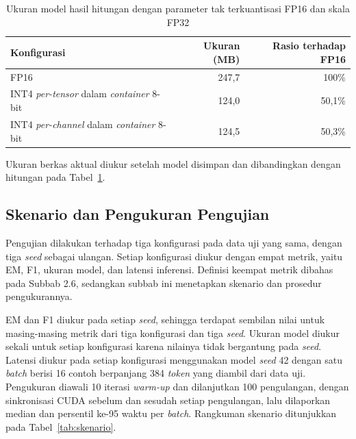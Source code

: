 \begin{table}[!ht]
  \centering
  \small
  \renewcommand{\arraystretch}{1.2}
  \caption{Ukuran model hasil hitungan dengan parameter tak terkuantisasi FP16 dan skala FP32}
  \label{tab:ukuran-model}
  \begin{tabularx}{\textwidth}{@{}Xrr@{}}
    \hline
    \textbf{Konfigurasi} & \textbf{Ukuran (MB)} & \textbf{Rasio terhadap FP16} \\
    \hline
    FP16 & 247,7 & 100\% \\
    INT4 \textit{per-tensor} dalam \textit{container} 8-bit & 124,0 & 50,1\% \\
    INT4 \textit{per-channel} dalam \textit{container} 8-bit & 124,5 & 50,3\% \\
    \hline
  \end{tabularx}
\end{table}

Ukuran berkas aktual diukur setelah model disimpan dan dibandingkan dengan hitungan pada Tabel~\ref{tab:ukuran-model}.

\subsection{Skenario dan Pengukuran Pengujian}

Pengujian dilakukan terhadap tiga konfigurasi pada data uji yang sama, dengan tiga \textit{seed} sebagai ulangan. Setiap konfigurasi diukur dengan empat metrik, yaitu EM, F1, ukuran model, dan latensi inferensi. Definisi keempat metrik dibahas pada Subbab 2.6, sedangkan subbab ini menetapkan skenario dan prosedur pengukurannya.

EM dan F1 diukur pada setiap \textit{seed}, sehingga terdapat sembilan nilai untuk masing-masing metrik dari tiga konfigurasi dan tiga \textit{seed}. Ukuran model diukur sekali untuk setiap konfigurasi karena nilainya tidak bergantung pada \textit{seed}. Latensi diukur pada setiap konfigurasi menggunakan model \textit{seed} 42 dengan satu \textit{batch} berisi 16 contoh berpanjang 384 \textit{token} yang diambil dari data uji. Pengukuran diawali 10 iterasi \textit{warm-up} dan dilanjutkan 100 pengulangan, dengan sinkronisasi CUDA sebelum dan sesudah setiap pengulangan, lalu dilaporkan median dan persentil ke-95 waktu per \textit{batch}. Rangkuman skenario ditunjukkan pada Tabel~\ref{tab:skenario}.

